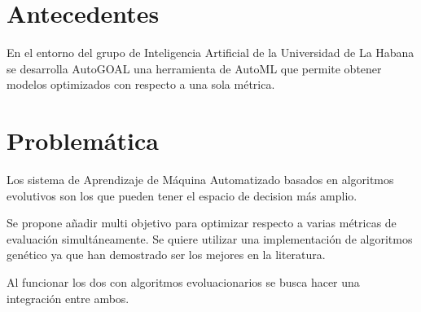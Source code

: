 





\section*{Antecedentes}
En el entorno del grupo de Inteligencia Artificial de la Universidad de La Habana se desarrolla AutoGOAL una herramienta de AutoML que permite obtener modelos optimizados con respecto a una sola m\'etrica.

\section*{Problem\'atica}
Los sistema de Aprendizaje de M\'aquina Automatizado basados en algoritmos evolutivos son los que pueden tener el espacio de decision m\'as amplio.

Se propone añadir multi objetivo para optimizar respecto a varias m\'etricas de evaluaci\'on simult\'aneamente. Se quiere utilizar una implementaci\'on de algoritmos gen\'etico ya que han demostrado ser los mejores en la literatura.

Al funcionar los dos con algoritmos evoluacionarios se busca hacer una integraci\'on entre ambos.




